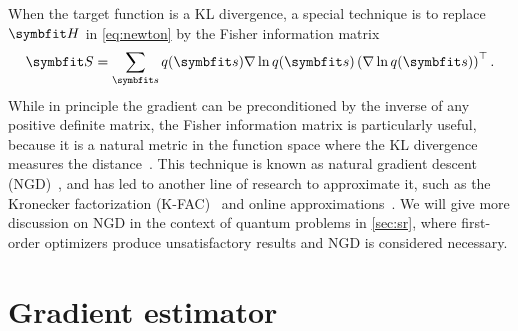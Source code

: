 When the target function is a KL divergence, a special technique is to replace $\mH$ in \cref{eq:newton} by the Fisher information matrix
\begin{equation}
\mS = \sum_\vs q(\vs) \nabla \ln q(\vs) \left( \nabla \ln q(\vs) \right)^\transpose.
\label{eq:fim}
\end{equation}
While in principle the gradient can be preconditioned by the inverse of any positive definite matrix, the Fisher information matrix is particularly useful, because it is a natural metric in the function space where the KL divergence measures the distance~\cite{martens2020new}. This technique is known as natural gradient descent (NGD)~\cite{amari1998natural}, and has led to another line of research to approximate it, such as the Kronecker factorization (K-FAC)~\cite{martens2015optimizing} and online approximations~\cite{roux2007topmoumoute, ollivier2017true}. We will give more discussion on NGD in the context of quantum problems in \cref{sec:sr}, where first-order optimizers produce unsatisfactory results and NGD is considered necessary.

\section{Gradient estimator}

